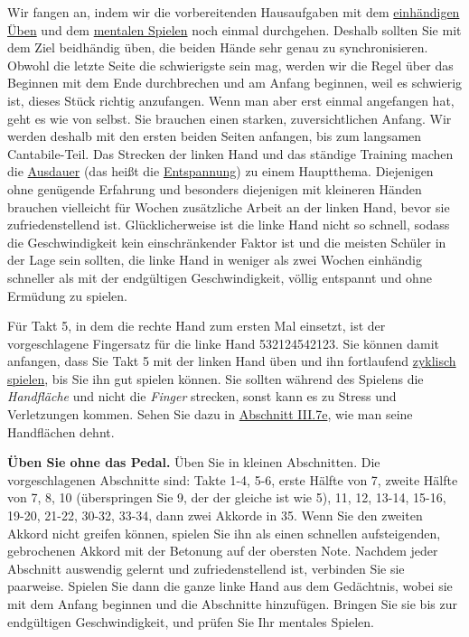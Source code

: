 Wir fangen an, indem wir die vorbereitenden Hausaufgaben mit dem \hyperlink{c1ii7}{einhändigen Üben} und dem \hyperlink{c1ii12mental}{mentalen Spielen} noch einmal durchgehen.
Deshalb sollten Sie mit dem Ziel beidhändig üben, die beiden Hände sehr genau zu synchronisieren.
Obwohl die letzte Seite die schwierigste sein mag, werden wir die Regel über das Beginnen mit dem Ende durchbrechen und am Anfang beginnen, weil es schwierig ist, dieses Stück richtig anzufangen.
Wenn man aber erst einmal angefangen hat, geht es wie von selbst.
Sie brauchen einen starken, zuversichtlichen Anfang.
Wir werden deshalb mit den ersten beiden Seiten anfangen, bis zum langsamen Cantabile-Teil.
Das Strecken der linken Hand und das ständige Training machen die \hyperlink{c1ii21}{Ausdauer} (das heißt die \hyperlink{c1ii14}{Entspannung}) zu einem Hauptthema.
Diejenigen ohne genügende Erfahrung und besonders diejenigen mit kleineren Händen brauchen vielleicht für Wochen zusätzliche Arbeit an der linken Hand, bevor sie zufriedenstellend ist.
Glücklicherweise ist die linke Hand nicht so schnell, sodass die Geschwindigkeit kein einschränkender Faktor ist und die meisten Schüler in der Lage sein sollten, die linke Hand in weniger als zwei Wochen einhändig schneller als mit der endgültigen Geschwindigkeit, völlig entspannt und ohne Ermüdung zu spielen.

Für Takt 5, in dem die rechte Hand zum ersten Mal einsetzt, ist der vorgeschlagene Fingersatz für die linke Hand 532124542123.
Sie können damit anfangen, dass Sie Takt 5 mit der linken Hand üben und ihn fortlaufend \hyperlink{c1iii2}{zyklisch spielen}, bis Sie ihn gut spielen können.
Sie sollten während des Spielens die \textit{Handfläche} und nicht die \textit{Finger} strecken, sonst kann es zu Stress und Verletzungen kommen.
Sehen Sie dazu in \hyperlink{c1iii7e}{Abschnitt III.7e}, wie man seine Handflächen dehnt.

\textbf{Üben Sie ohne das Pedal.}
Üben Sie in kleinen Abschnitten.
Die vorgeschlagenen Abschnitte sind: Takte 1-4, 5-6, erste Hälfte von 7, zweite Hälfte von 7, 8, 10 (überspringen Sie 9, der der gleiche ist wie 5), 11, 12, 13-14, 15-16, 19-20, 21-22, 30-32, 33-34, dann zwei Akkorde in 35.
Wenn Sie den zweiten Akkord nicht greifen können, spielen Sie ihn als einen schnellen aufsteigenden, gebrochenen Akkord mit der Betonung auf der obersten Note.
Nachdem jeder Abschnitt auswendig gelernt und zufriedenstellend ist, verbinden Sie sie paarweise.
Spielen Sie dann die ganze linke Hand aus dem Gedächtnis, wobei sie mit dem Anfang beginnen und die Abschnitte hinzufügen.
Bringen Sie sie bis zur endgültigen Geschwindigkeit, und prüfen Sie Ihr mentales Spielen.

